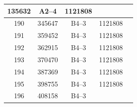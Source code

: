 \documentclass[UTF8,10pt,a4paper,fontset=fandol]{ctexart}
\newcommand{\fieldvalue}[1]{#1}
\begin{document}
\begin{tabularx}{\textwidth}{|c|c|c|c|X|}
\fieldvalue{135632} &
\fieldvalue{A2--4} &
\fieldvalue{1121808} & \\ \hline
\fieldvalue{190} &
\fieldvalue{345647} &
\fieldvalue{B4--3} &
\fieldvalue{1121808} & \\ \hline
\fieldvalue{191} &
\fieldvalue{359452} &
\fieldvalue{B4--3} &
\fieldvalue{1121808} & \\ \hline
\fieldvalue{192} &
\fieldvalue{362915} &
\fieldvalue{B4--3} &
\fieldvalue{1121808} & \\ \hline
\fieldvalue{193} &
\fieldvalue{370470} &
\fieldvalue{B4--3} &
\fieldvalue{1121808} & \\ \hline
\fieldvalue{194} &
\fieldvalue{387369} &
\fieldvalue{B4--3} &
\fieldvalue{1121808} & \\ \hline
\fieldvalue{195} &
\fieldvalue{398755} &
\fieldvalue{B4--3} &
\fieldvalue{1121808} & \\ \hline
\fieldvalue{196} &
\fieldvalue{408158} &
\fieldvalue{B4--3} &

\end{tabularx}
\end{document}

